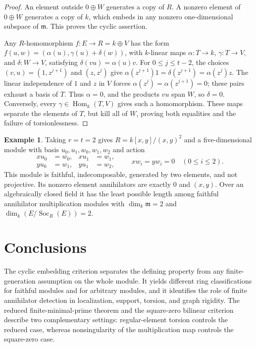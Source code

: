 \documentclass[11pt]{amsart}
\theoremstyle{plain}
\theoremstyle{definition}
\newtheorem{example}[theorem]{Example}
\theoremstyle{remark}
\DeclareMathOperator{\Hom}{Hom}
\DeclareMathOperator{\Soc}{Soc}
\numberwithin{equation}{section}
\begin{document}
\begin{proof}
An element outside $0\oplus W$ generates a copy of $R$.
A nonzero element of $0\oplus W$ generates a copy of $k$, which
embeds in any nonzero one-dimensional subspace of $\mathfrak m$.
This proves the cyclic assertion.

Any $R$-homomorphism $f:E\to R=k\oplus V$ has the form
$f(u,w)=(\alpha(u),\gamma(u)+\delta(w))$, with $k$-linear
maps $\alpha:T\to k$, $\gamma:T\to V$, and $\delta:W\to V$,
satisfying $\delta(vu)=\alpha(u)v$.
For $0\le j\le t-2$, the choices $(v,u)=(1,z^{j+1})$ and
$(z,z^j)$ give
$\alpha(z^{j+1})1=\delta(z^{j+1})=\alpha(z^j)z$.
The linear independence of $1$ and $z$ in $V$ forces
$\alpha(z^j)=\alpha(z^{j+1})=0$; these pairs exhaust a basis of $T$.
Thus $\alpha=0$, and the products $vu$ span $W$, so $\delta=0$.
Conversely, every $\gamma\in\Hom_k(T,V)$ gives such a homomorphism.
These maps separate the elements of $T$, but kill all of $W$, proving
both equalities and the failure of torsionlessness.
\end{proof}

\begin{example}\label{ex:five-dimensional-squarezero}
Taking $r=t=2$ gives $R=k[x,y]/(x,y)^2$ and a five-dimensional
module with basis $u_0,u_1,w_0,w_1,w_2$ and action
\[
 \begin{aligned}
 xu_0&=w_0,& xu_1&=w_1,\\
 yu_0&=w_1,& yu_1&=w_2,
 \end{aligned}
 \qquad xw_i=yw_i=0\quad(0\le i\le2).
\]
This module is faithful, indecomposable, generated by two elements,
and not projective. Its nonzero element annihilators are exactly
$0$ and $(x,y)$. Over an algebraically closed field it has the least
possible length among faithful annihilator multiplication modules
with $\dim_k\mathfrak m=2$ and
$\dim_k(E/\Soc_R(E))=2$.
\end{example}

\section*{Conclusions}

The cyclic embedding criterion separates the defining property from any
finite-generation assumption on the whole module. It yields different
ring classifications for faithful modules and for arbitrary modules, and
it identifies the role of finite annihilator detection in localization,
support, torsion, and graph rigidity.
The reduced finite-minimal-prime theorem and the square-zero bilinear
criterion describe two complementary settings: regular-element torsion
controls the reduced case, whereas nonsingularity of the multiplication
map controls the square-zero case.
\end{document}

